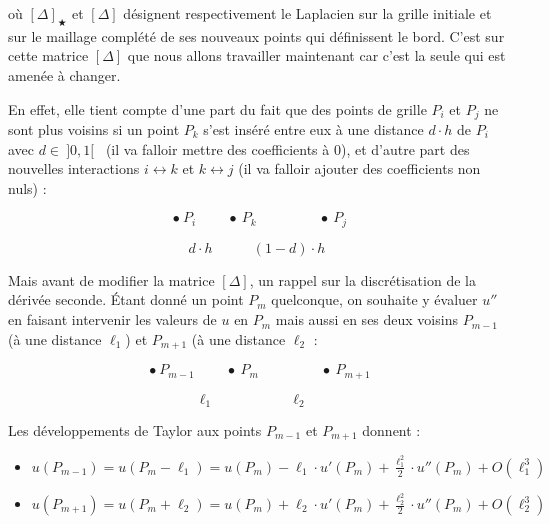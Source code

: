 \documentclass[12pt]{article}
\def \disp {\displaystyle}
\begin{document}
\vspace{5 mm}

\noindent
où $[\Delta]_\bigstar$ et $[\Delta]$ désignent respectivement le Laplacien sur la grille initiale et sur le maillage complété de ses nouveaux points qui définissent le bord. C'est sur cette matrice $[\Delta]$ que nous allons travailler maintenant car c'est la seule qui est amenée à changer.

\vspace{5 mm}

\noindent
En effet, elle tient compte d'une part du fait que des points de grille $P_i$ et $P_j$ ne sont plus voisins si un point $P_k$ s'est inséré entre eux à une distance $d \cdot h$ de $P_i$ avec $d \in~]0,1[$~ (il va falloir mettre des coefficients à 0), et d'autre part des nouvelles interactions $i \leftrightarrow k$ et $k \leftrightarrow j$ (il va falloir ajouter des coefficients non nuls) :


$$\bullet~P_i ~~~~~~~~~~ \bullet~P_k ~~~~~~~~~~~~~~~~~~~~ \bullet~P_j$$

$$~~~~d \cdot h ~~~~~~~~~~~~~ (1-d) \cdot h~~~~~~$$

\vspace{5 mm}

\noindent
Mais avant de modifier la matrice $[\Delta]$, un rappel sur la discrétisation de la dérivée seconde. Étant donné un point $P_m$ quelconque, on souhaite y évaluer $u''$ en faisant intervenir les valeurs de $u$ en $P_m$ mais aussi en ses deux voisins $P_{m-1}$ (à une distance $\ell_1$) et $P_{m+1}$ (à une distance $\ell_2$ :

$$\bullet~P_{m-1} ~~~~~~~~~~ \bullet~P_m ~~~~~~~~~~~~~~~~~~~~ \bullet~P_{m+1}$$

$$~~~~~~\ell_1 ~~~~~~~~~~~~~~~~~~~~~~~~ \ell_2 ~~~~~~~~~~~$$

\vspace{5 mm}

\noindent
Les développements de Taylor aux points $P_{m-1}$ et $P_{m+1}$ donnent :

\vspace{5 mm}

\noindent
\begin{itemize}
	\item $\disp u(P_{m-1}) = u(P_m - \ell_1) = u(P_m) - \ell_1 \cdot u'(P_m) + \frac{\ell_1^2}{2} \cdot u''(P_m) + O(\ell_1^3)$

\vspace{5 mm}

	\item $\disp u(P_{m+1}) = u(P_m + \ell_2) = u(P_m) + \ell_2 \cdot u'(P_m) + \frac{\ell_2^2}{2} \cdot u''(P_m) + O(\ell_2^3)$
\end{itemize}
\end{document}
